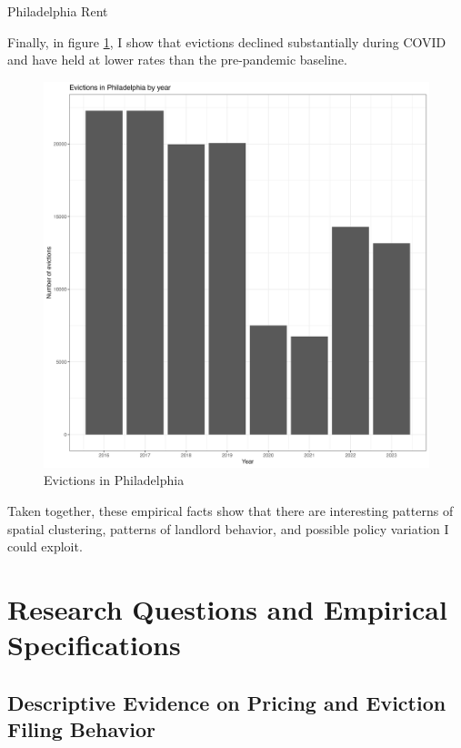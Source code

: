 \documentclass{article}
\begin{document}
\begin{table}[htbp]
    
    \caption{Philadelphia Rent}
    \label{tab:philly-rent}
\end{table}


Finally, in figure \ref{fig:philly-year}, I show that evictions declined substantially during COVID and have held at lower rates than the pre-pandemic baseline. \\

\begin{figure}[htbp]
    \centering
    \includegraphics[width=1\linewidth]{figs/evict_by_year.png}
    \caption{Evictions in Philadelphia}
    \label{fig:philly-year}
\end{figure}

Taken together, these empirical facts show that there are interesting patterns of spatial clustering, patterns of landlord behavior, and possible policy variation I could exploit.
\pagebreak
\section{Research Questions and Empirical Specifications}

\subsection{Descriptive Evidence on Pricing and Eviction Filing Behavior}
\end{document}
